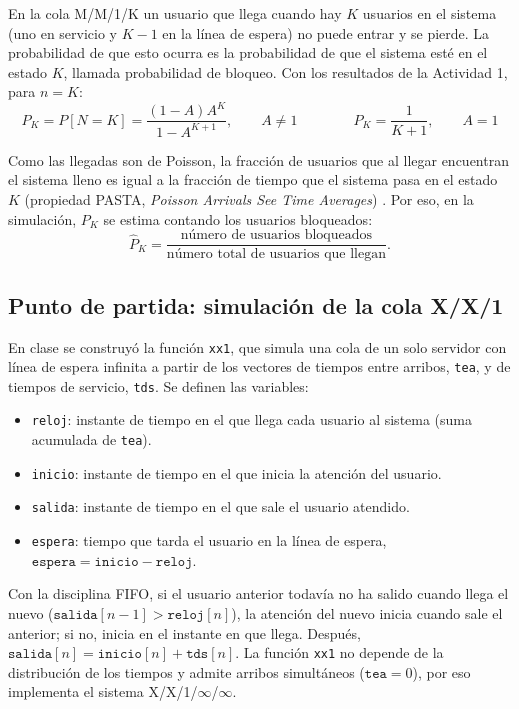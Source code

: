 \documentclass[12pt]{article}
\begin{document}
En la cola M/M/1/K un usuario que llega cuando hay $K$ usuarios en el sistema (uno en servicio y $K-1$ en la línea de espera) no puede entrar y se pierde. La probabilidad de que esto ocurra es la probabilidad de que el sistema esté en el estado $K$, llamada probabilidad de bloqueo. Con los resultados de la Actividad 1, para $n=K$:
\[
\boxed{P_K=P[N=K]=\frac{(1-A)A^{K}}{1-A^{K+1}},\qquad A\neq 1}
\qquad\qquad
\boxed{P_K=\frac{1}{K+1},\qquad A=1}
\]

Como las llegadas son de Poisson, la fracción de usuarios que al llegar encuentran el sistema lleno es igual a la fracción de tiempo que el sistema pasa en el estado $K$ (propiedad PASTA, \emph{Poisson Arrivals See Time Averages}) \autocite{shortle2018}. Por eso, en la simulación, $P_K$ se estima contando los usuarios bloqueados:
\[
\hat{P}_K=\frac{\text{número de usuarios bloqueados}}{\text{número total de usuarios que llegan}} .
\]

\subsection{Punto de partida: simulación de la cola X/X/1}

En clase se construyó la función \texttt{xx1}, que simula una cola de un solo servidor con línea de espera infinita a partir de los vectores de tiempos entre arribos, \texttt{tea}, y de tiempos de servicio, \texttt{tds}. Se definen las variables:

\begin{itemize}
    \item \texttt{reloj}: instante de tiempo en el que llega cada usuario al sistema (suma acumulada de \texttt{tea}).
    \item \texttt{inicio}: instante de tiempo en el que inicia la atención del usuario.
    \item \texttt{salida}: instante de tiempo en el que sale el usuario atendido.
    \item \texttt{espera}: tiempo que tarda el usuario en la línea de espera, $\texttt{espera}=\texttt{inicio}-\texttt{reloj}$.
\end{itemize}

Con la disciplina FIFO, si el usuario anterior todavía no ha salido cuando llega el nuevo ($\texttt{salida}[n-1]>\texttt{reloj}[n]$), la atención del nuevo inicia cuando sale el anterior; si no, inicia en el instante en que llega. Después, $\texttt{salida}[n]=\texttt{inicio}[n]+\texttt{tds}[n]$. La función \texttt{xx1} no depende de la distribución de los tiempos y admite arribos simultáneos ($\texttt{tea}=0$), por eso implementa el sistema X/X/1/$\infty$/$\infty$.
\end{document}
